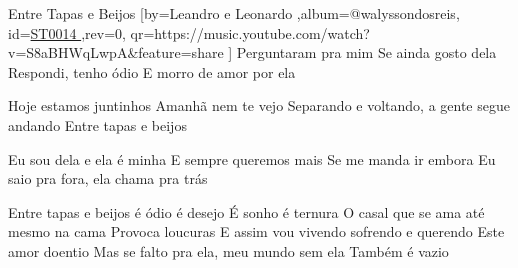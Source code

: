 \beginsong
{Entre Tapas e Beijos %
}[by={Leandro e Leonardo %
},album={@walyssondosreis},
id={\href{https://music.youtube.com/watch?v=S8aBHWqLwpA&feature=share %
}{ST0014 %
}},rev={0}, %
qr={https://music.youtube.com/watch?v=S8aBHWqLwpA&feature=share %
}]
\beginverse
Perguntaram pra mim
Se ainda gosto dela
Respondi, tenho ódio
E morro de amor por ela
\endverse

\beginverse
Hoje estamos juntinhos
Amanhã nem te vejo
Separando e voltando, a gente segue andando
Entre tapas e beijos
\endverse

\beginverse
Eu sou dela e ela é minha
E sempre queremos mais
Se me manda ir embora
Eu saio pra fora, ela chama pra trás
\endverse

\beginchorus
Entre tapas e beijos é ódio é desejo
É sonho é ternura
O casal que se ama até mesmo na cama
Provoca loucuras
E assim vou vivendo sofrendo e querendo
Este amor doentio
Mas se falto pra ela, meu mundo sem ela
Também é vazio
\endchorus


